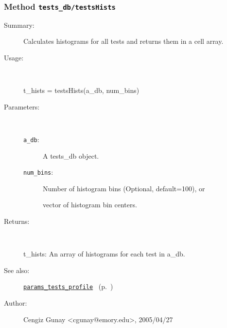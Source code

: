 \subsubsection[Method \texttt{testsHists}]{Method \texttt{tests\_db/testsHists}}%
%
\label{ref_tests_db__testsHists}%
\hypertarget{ref_tests_db__testsHists}{}%
\begin{description}
\item[Summary:]Calculates histograms for all tests and returns them in a cell array.
%
\item[Usage:]~%
\begin{lyxcode}%
t\_hists = testsHists(a\_db, num\_bins)
%
\end{lyxcode}%
%
%
\item[Parameters:]~
\begin{description}%
\item[\texttt{a\_db}:]
 A tests\_db object.
\item[\texttt{num\_bins}:]
 Number of histogram bins (Optional, default=100), or

vector of histogram bin centers.\end{description}%
%
\item[Returns:]~

	t\_hists: An array of histograms for each test in a\_db.
%
%
\item[See also:]%
\hyperlink{ref_params_tests_profile}{\texttt{params\_tests\_profile}}%
\ (p.~\pageref{ref_params_tests_profile})%
%
%
\item[Author:]%
Cengiz Gunay <cgunay@emory.edu>, 2005/04/27%
\end{description}
\methodline%
